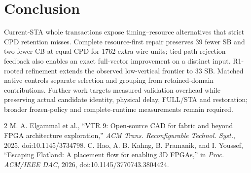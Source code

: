 \documentclass[conference,10pt]{IEEEtran}
\begin{document}
\section{Conclusion}
Current-STA whole transactions expose timing--resource alternatives that strict CPD retention misses. Complete resource-first repair preserves 39 fewer SB and two fewer CB at equal CPD for 1762 extra wire units; tied-path rejection feedback also enables an exact full-vector improvement on a distinct input. R1-rooted refinement extends the observed low-vertical frontier to 33 SB. Matched native controls separate selection and grouping from retained-domain contributions. Further work targets measured validation overhead while preserving actual candidate identity, physical delay, FULL/STA and restoration; broader frozen-policy and complete-runtime measurements remain required.

\begin{thebibliography}{2}
 M. A. Elgammal et al., ``VTR 9: Open-source CAD for fabric and beyond FPGA architecture exploration,'' \emph{ACM Trans. Reconfigurable Technol. Syst.}, 2025, doi:10.1145/3734798.
 C. Hao, A. B. Kahng, B. Pramanik, and I. Youssef, ``Escaping Flatland: A placement flow for enabling 3D FPGAs,'' in \emph{Proc. ACM/IEEE DAC}, 2026, doi:10.1145/3770743.3804424.
\end{thebibliography}
\end{document}
